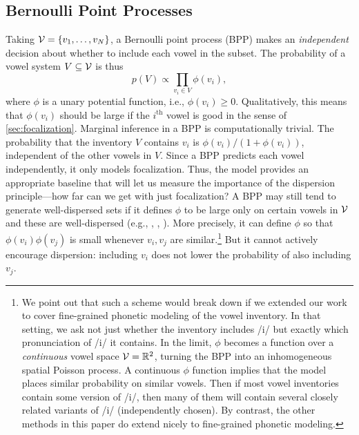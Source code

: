 \documentclass[11pt,a4paper]{article}
\newcommand{\Real}{\mathbb{R}}
\newcommand{\phone}[1]{\textipa{[#1]}}
\begin{document}
\subsection{Bernoulli Point Processes}
Taking ${\cal V} = \{v_1, \ldots, v_N\}$, 
a Bernoulli
point process (BPP) makes an {\em independent} decision
about whether to include each vowel in the subset. The
probability of a vowel system $V \subseteq {\cal V}$ is thus
\begin{equation}\label{eq:bpp}
  p(V) \propto \prod_{v_i \in V} \phi(v_i),
\end{equation}
where $\phi$ is a unary potential function, i.e., $\phi(v_i) \geq 0$.
Qualitatively, this means that $\phi(v_i)$ should be large if the $i^\text{th}$
vowel is good in the sense of \cref{sec:focalization}.
Marginal inference in a BPP is computationally trivial.  The probability that the inventory $V$ contains $v_i$ is $\phi(v_i)/(1+\phi(v_i))$, independent of the other vowels in $V$.
Since a BPP predicts each vowel independently, it only models focalization.  Thus, the model provides an appropriate baseline that will let us measure the importance of the dispersion principle---how far can we get with just focalization?  
A BPP may still tend to generate well-dispersed sets if it defines $\phi$ to be large only on certain vowels in $\cal V$ and these are well-dispersed (e.g., \phone{i}, \phone{u}, \phone{a}).  More precisely, it can define $\phi$ so that  $\phi(v_i) \phi(v_j)$ is small whenever $v_i, v_j$ are similar.\footnote{\label{fn:continuous}We point out that such a scheme would break down if we extended our work to cover fine-grained phonetic modeling of the vowel inventory.  In that setting, we ask not just whether the inventory includes /i/ but exactly which pronunciation of /i/ it contains.  In the limit, $\phi$ becomes a function over a {\em continuous} vowel space ${\cal V} = \Real^2$, turning the BPP into an inhomogeneous spatial Poisson process.  A continuous $\phi$ function implies that the model places similar probability on similar vowels.  Then if most vowel inventories contain some version of /i/, then many of them will contain several closely related variants of /i/ (independently chosen).  By contrast, the other methods in this paper do extend nicely to fine-grained phonetic modeling.}  But it cannot actively encourage dispersion: including $v_i$ does not lower the probability of also including $v_j$.  
\end{document}
